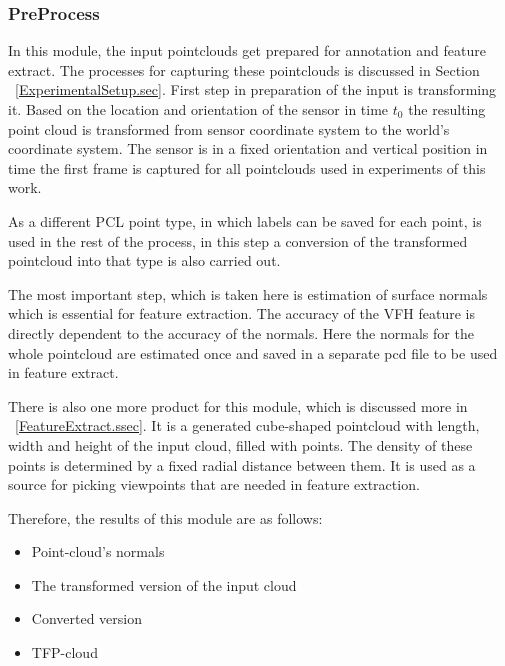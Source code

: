 \subsubsection{PreProcess}
\label{PreProcess.ssec}
 In this module, the input pointclouds get prepared for annotation and feature extract. 
 The processes for capturing these pointclouds is discussed in Section ~\ref{ExperimentalSetup.sec}. 
 First step in preparation of the input is transforming it.
 Based on the location and orientation of the sensor in time $t_0$ the resulting point cloud is transformed from 
 sensor coordinate system to the world's coordinate system.
 The sensor is in a fixed orientation and vertical position in time the first frame is captured for all pointclouds 
 used in experiments of this work.
 
 As a different PCL point type, in which labels can be saved for each point, is used in the rest of the process, 
 in this step a conversion of the transformed pointcloud into that type  is also carried out.
 
 The most important step, which is taken here is estimation of surface normals which is essential for feature extraction. 
 The accuracy of the VFH feature is directly dependent to the accuracy of the normals. 
 Here the normals for the whole pointcloud are estimated once and saved in a separate pcd file to be used in 
 feature extract. 
 
 There is also one more product for this module, which is discussed more in ~\ref{FeatureExtract.ssec}.
 It is a generated cube-shaped pointcloud with length, width and height of the input cloud, filled with points.
 The density of these points is determined by a fixed radial distance between them.
 It is used as a source for picking viewpoints that are needed in feature extraction.
 
 Therefore, the results of this module are as follows:
 \begin{itemize}
  \item Point-cloud's normals
  \item The transformed version of the input cloud
  \item Converted version
  \item TFP-cloud
 \end{itemize}
 
